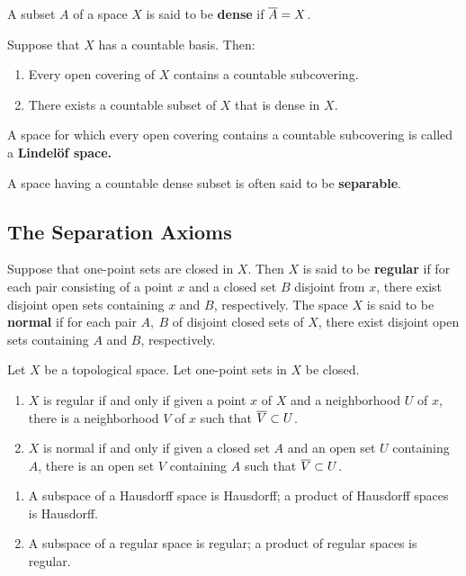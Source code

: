 \dfn A subset $A$ of a space $X$ is said to be \textbf{dense} if $\overline A = X$.

\vs

\begin{thm}
Suppose that $X$ has a countable basis. Then:
\begin{enumerate}
    \item Every open covering of $X$ contains a countable subcovering.
    \item There exists a countable subset of $X$ that is dense in $X$.
\end{enumerate}
\end{thm}

\vs

\dfn A space for which every open covering contains a countable subcovering is called a \textbf{Lindel\"of space.}

\vs

\dfn A space having a countable dense subset is often said to be \textbf{separable}.



\subsection{The Separation Axioms}\nl
\setcounter{section}{31}
\setcounter{thm}{0}

\dfn Suppose that one-point sets are closed in $X$. Then $X$ is said to be \textbf{regular} if for each pair consisting of a point $x$ and a closed set $B$ disjoint from $x$, there exist disjoint open sets containing $x$ and $B$, respectively. The space $X$ is said to be \textbf{normal} if for each pair $A,\ B$ of disjoint closed sets of $X$, there exist disjoint open sets containing $A$ and $B$, respectively.

\vs

\begin{lem}
Let $X$ be a topological space. Let one-point sets in $X$ be closed.
\begin{enumerate}
    \item $X$ is regular if and only if given a point $x$ of $X$ and a neighborhood $U$ of $x$, there is a neighborhood $V$ of $x$ such that $\overline V\subset U$.
    \item $X$ is normal if and only if given a closed set $A$ and an open set $U$ containing $A$, there is an open set $V$ containing $A$ such that $\overline V\subset U$.
\end{enumerate}

\vs
\newpage
\begin{thm}\nl
\begin{enumerate}
    \item A subspace of a Hausdorff space is Hausdorff; a product of Hausdorff spaces is Hausdorff.
    \item A subspace of a regular space is regular; a product of regular spaces is regular.
\end{enumerate}
\end{thm}
\end{lem}


